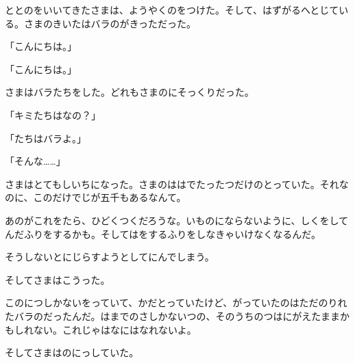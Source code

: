 ととのをいいてきたさまは、ようやくのをつけた。そして、はずがるへとじている。さまのきいたはバラのがきっただった。

「こんにちは。」

「こんにちは。」

さまはバラたちをした。どれもさまのにそっくりだった。

「キミたちはなの？」

「たちはバラよ。」

「そんな……」

さまはとてもしいちになった。さまのははでたったつだけのとっていた。それなのに、このだけでじが五千もあるなんて。

あのがこれをたら、ひどくつくだろうな。いものにならないように、しくをしてんだふりをするかも。そしてはをするふりをしなきゃいけなくなるんだ。

そうしないとにじらすようとしてにんでしまう。

そしてさまはこうった。

このにつしかないをっていて、かだとっていたけど、がっていたのはただのりれたバラのだったんだ。はまでのさしかないつの、そのうちのつはにがえたままかもしれない。これじゃはなにはなれないよ。

そしてさまはのにっしていた。


